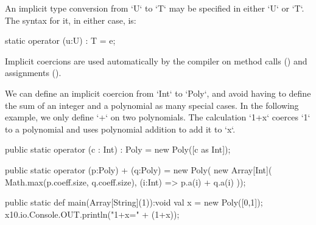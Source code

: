 An implicit type conversion from \xcd`U`  to \xcd`T` may be specified in
either \xcd`U` or \xcd`T`.  
The syntax for it, in either case, is: 
\begin{xten}
static operator (u:U) : T = e;
\end{xten}




Implicit coercions are used automatically by the compiler on method calls 
() and assignments ().


\begin{ex}
We can define an implicit coercion from \xcd`Int` to \xcd`Poly`,
and avoid having to define the sum of an integer and a polynomial
as many special cases.  In the following example, we only define \xcd`+` on
two polynomials.  The
calculation \xcd`1+x` coerces \xcd`1` to a polynomial and uses polynomial
addition to add it to \xcd`x`.


\begin{xten}
  public static operator (c : Int) : Poly 
     = new Poly([c as Int]);

  public static operator (p:Poly) + (q:Poly) = new Poly(
      new Array[Int](
        Math.max(p.coeff.size, q.coeff.size),
        (i:Int) => p.a(i) + q.a(i)
     ));

  public static def main(Array[String](1)):void {
     val x = new Poly([0,1]);
     x10.io.Console.OUT.println("1+x=" + (1+x));
  }
\end{xten}
\end{ex}



